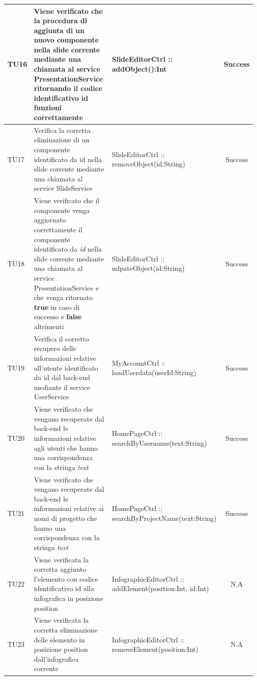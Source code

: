 \begin{table}[H]
\begin{center}
\begin{tabular}{|l|p{}|p{}|c|}

	\toprule
		TU16 & Viene verificato che la procedura di aggiunta di un nuovo componente nella slide corrente mediante una chiamata al service PresentationService ritornando il codice identificativo id funzioni correttamente & SlideEditorCtrl :: addObject():Int & Success\\
	\midrule
		TU17 & Verifica la corretta eliminazione di un componente identificato da id nella slide corrente
mediante una chiamata al service SlideService & SlideEditorCtrl :: removeObject(id:String) & Success\\
	\midrule
		TU18 & Viene verificato che il componente venga aggiornato correttamente il componente identificato da \textit{id} nella slide corrente mediante una chiamata al service PresentationService e che venga ritornato \textbf{true} in caso di successo e \textbf{false} altrimenti & SlideEditorCtrl :: udpateObject(id:String) & Success\\

	\midrule
		TU19 &  Verifica il corretto recupero delle informazioni relative all'utente identificato da id dal back-end 
mediante il service UserService & MyAccountCtrl :: loadUserdata(userId:String) & Success\\
	\midrule
		TU20 & Viene verificato che vengano recuperate dal back-end le informazioni relative agli utenti che hanno una corrispondenza con la stringa \textit{text} & HomePageCtrl :: searchByUsername(text:String) & Success\\
	\midrule
		TU21 & Viene verificato che vengano recuperate dal back-end le informazioni relative ai nomi di progetto che hanno una corrispondenza con la stringa \textit{text} & HomePageCtrl :: searchByProjectName(text:String) & Success\\
	\midrule
		TU22 & Viene verificata la corretta aggiunto l'elemento con codice identificativo id alla infografica
in posizione position & InfographicEditorCtrl :: addElement(position:Int, id:Int) & N.A\\
	\midrule
		TU23 & Viene verificata la corretta eliminazione delle elemento in posizione position dall'infografica corrente & InfographicEditorCtrl :: removeElement(position:Int) & N.A\\

\bottomrule

\end{tabular}
\end{center}
\end{table}

